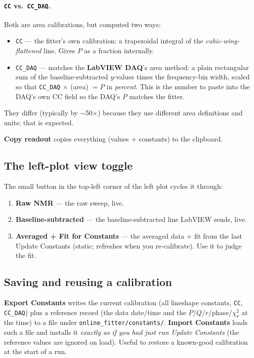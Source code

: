 \documentclass[11pt]{article}
\newcommand{\code}[1]{\lstinline[style=plain]|#1|}
\begin{document}
\paragraph{\code{CC} vs.\ \code{CC_DAQ}.} Both are area calibrations, but computed two ways:
\begin{itemize}[nosep]
  \item \code{CC} --- the fitter's own calibration: a trapezoidal integral of the
        \emph{cubic-wing-flattened} line. Gives $P$ as a fraction internally.
  \item \code{CC_DAQ} --- matches the \textbf{LabVIEW DAQ}'s area method: a plain rectangular
        sum of the baseline-subtracted $y$-values times the frequency-bin width, scaled so that
        \code{CC_DAQ} $\times$ (area) $= P$ in \emph{percent}. This is the number to paste into
        the DAQ's own CC field so the DAQ's $P$ matches the fitter.
\end{itemize}
They differ (typically by $\sim$50$\times$) because they use different area definitions and
units; that is expected.

\textbf{Copy readout} copies everything (values + constants) to the clipboard.

\subsection{The left-plot view toggle}
\label{sec:leftview}

The small button in the top-left corner of the left plot cycles it through:
\begin{enumerate}[nosep]
  \item \textbf{Raw NMR} --- the raw sweep, live.
  \item \textbf{Baseline-subtracted} --- the baseline-subtracted line LabVIEW sends, live.
  \item \textbf{Averaged + Fit for Constants} --- the averaged data + fit from the last
        Update Constants (static; refreshes when you re-calibrate). Use it to judge the fit.
\end{enumerate}

\subsection{Saving and reusing a calibration}

\textbf{Export Constants} writes the current calibration (all lineshape constants, \code{CC},
\code{CC_DAQ}) plus a reference record (the data date/time and the $P$/$Q$/$r$/phase/$\chi^2_\nu$
at the time) to a file under \code{online_fitter/constants/}. \textbf{Import Constants} loads
such a file and installs it \emph{exactly as if you had just run Update Constants} (the
reference values are ignored on load). Useful to restore a known-good calibration at the start
of a run.
\end{document}
